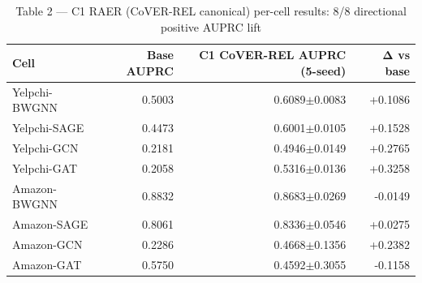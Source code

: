 \begin{table}[ht]
\centering
\caption{Table 2 — C1 RAER (CoVER-REL canonical) per-cell results: 8/8 directional positive AUPRC lift}
\small
\begin{tabular}{lrrr}
\toprule
Cell & Base AUPRC & C1 CoVER-REL AUPRC (5-seed) & Δ vs base \\
\midrule
Yelpchi-BWGNN & 0.5003 & 0.6089$\pm$0.0083 & +0.1086 \\
Yelpchi-SAGE & 0.4473 & 0.6001$\pm$0.0105 & +0.1528 \\
Yelpchi-GCN & 0.2181 & 0.4946$\pm$0.0149 & +0.2765 \\
Yelpchi-GAT & 0.2058 & 0.5316$\pm$0.0136 & +0.3258 \\
Amazon-BWGNN & 0.8832 & 0.8683$\pm$0.0269 & -0.0149 \\
Amazon-SAGE & 0.8061 & 0.8336$\pm$0.0546 & +0.0275 \\
Amazon-GCN & 0.2286 & 0.4668$\pm$0.1356 & +0.2382 \\
Amazon-GAT & 0.5750 & 0.4592$\pm$0.3055 & -0.1158 \\
\bottomrule
\end{tabular}
\end{table}
